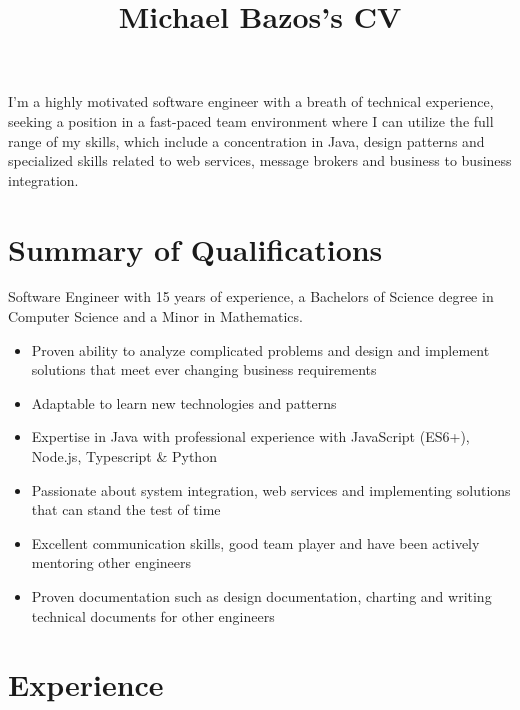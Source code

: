 \documentclass[a4paper,online]{adcv}
\title{Michael Bazos’s CV}
\begin{document}
I’m a highly motivated software engineer with a breath of technical experience, seeking a position in a fast-paced team environment where I can utilize the full range of my skills, which include a concentration in Java, design patterns and specialized skills related to web services, message brokers and business to business integration.

\section{Summary of Qualifications}

\begin{adcvtabletwo}
Software Engineer with 15 years of experience, a Bachelors of Science degree in Computer Science and a Minor in Mathematics.
  \begin{itemize}
    \item Proven ability to analyze complicated problems and design and implement solutions that meet ever changing business requirements
    \item Adaptable to learn new technologies and patterns
    \item Expertise in Java with professional experience with JavaScript (ES6+), Node.js, Typescript \& Python
    \item Passionate about system integration, web services and implementing solutions that can stand the test of time
    \item Excellent communication skills, good team player and have been actively mentoring other engineers
    \item Proven documentation such as design documentation, charting and writing technical documents for other engineers
  \end{itemize}
\end{adcvtabletwo}

\section{Experience}
\end{document}
